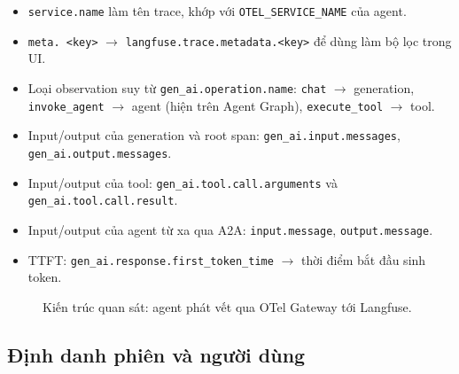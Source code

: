 \begin{itemize}
  \item \texttt{service.name} làm tên trace, khớp với
  \texttt{OTEL\allowbreak\_SERVICE\allowbreak\_NAME} của agent.
  \item \texttt{meta.\,<key>} $\rightarrow$ \texttt{langfuse.trace.metadata.<key>} để dùng
  làm bộ lọc trong UI.
  \item Loại observation suy từ \texttt{gen\_ai.operation.name}: \texttt{chat} $\rightarrow$
  generation, \texttt{invoke\_agent} $\rightarrow$ agent (hiện trên Agent Graph),
  \texttt{execute\_tool} $\rightarrow$ tool.
  \item Input/output của generation và root span: \texttt{gen\_ai.input.messages},
  \texttt{gen\_ai.output.messages}.
  \item Input/output của tool: \texttt{gen\_ai.tool.call.arguments} và
  \texttt{gen\_ai.tool.call.result}.
  \item Input/output của agent từ xa qua A2A: \texttt{input.message},
  \texttt{output.message}.
  \item TTFT: \texttt{gen\_ai.response.first\_token\_time} $\rightarrow$ thời điểm bắt đầu
  sinh token.
\end{itemize}

\begin{figure}[htbp]
\centering
{}
\caption{Kiến trúc quan sát: agent phát vết qua OTel Gateway tới Langfuse.}
\label{fig:otgateway}
\end{figure}

\subsection{Định danh phiên và người dùng}

